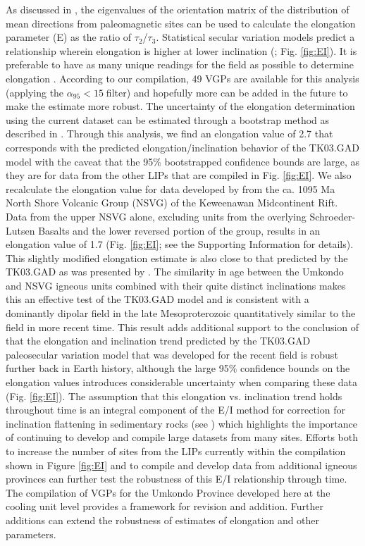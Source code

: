\documentclass[11pt,letterpaper]{article}
\begin{document}
As discussed in \cite{Tauxe2004a}, the eigenvalues of the orientation matrix of the distribution of mean directions from paleomagnetic sites can be used to calculate the elongation parameter (E) as the ratio of $\tau_2$/$\tau_3$. Statistical secular variation models predict a relationship wherein elongation is higher at lower inclination (\cite{Tauxe2008a}; Fig. \ref{fig:EI}). It is preferable to have as many unique readings for the field as possible to determine elongation \citep{Tauxe2008a}. According to our compilation, 49 VGPs are available for this analysis (applying the $\alpha_{95}<15$\textdegree$\;$filter) and hopefully more can be added in the future to make the estimate more robust. The uncertainty of the elongation determination using the current dataset can be estimated through a bootstrap method as described in \cite{Tauxe2008a}. Through this analysis, we find an elongation value of 2.7 that corresponds with the predicted elongation/inclination behavior of the TK03.GAD model with the caveat that the 95$\%$ bootstrapped confidence bounds are large, as they are for data from the other LIPs that are compiled in Fig. \ref{fig:EI}. We also recalculate the elongation value for data developed by \cite{Tauxe2009a} from the ca. 1095 Ma North Shore Volcanic Group (NSVG) of the Keweenawan Midcontinent Rift. Data from the upper NSVG alone, excluding units from the overlying Schroeder-Lutsen Basalts and the lower reversed portion of the group, results in an elongation value of 1.7 (Fig. \ref{fig:EI}; see the Supporting Information for details). This slightly modified elongation estimate is also close to that predicted by the TK03.GAD as was presented by \cite{Tauxe2009a}. The similarity in age between the Umkondo and NSVG igneous units combined with their quite distinct inclinations makes this an effective test of the TK03.GAD model and is consistent with a dominantly dipolar field in the late Mesoproterozoic quantitatively similar to the field in more recent time. This result adds additional support to the conclusion of \cite{Tauxe2009a} that the elongation and inclination trend predicted by the TK03.GAD paleosecular variation model that was developed for the recent field is robust further back in Earth history, although the large 95$\%$ confidence bounds on the elongation values introduces considerable uncertainty when comparing these data (Fig. \ref{fig:EI}). The assumption that this elongation vs. inclination trend holds throughout time is an integral component of the E/I method for correction for inclination flattening in sedimentary rocks (see \citealt{Tauxe2008a}) which highlights the importance of continuing to develop and compile large datasets from many sites. Efforts both to increase the number of sites from the LIPs currently within the compilation shown in Figure \ref{fig:EI} and to compile and develop data from additional igneous provinces can further test the robustness of this E/I relationship through time. The compilation of VGPs for the Umkondo Province developed here at the cooling unit level provides a framework for revision and addition. Further additions can extend the robustness of estimates of elongation and other parameters.
\end{document}
